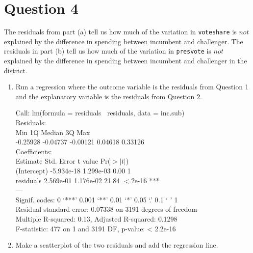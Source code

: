 \documentclass[12pt,letterpaper]{article}
\begin{document}
\section*{Question 4}
\noindent The residuals from part (a) tell us how much of the variation in \texttt{voteshare} is $not$ explained by the difference in spending between incumbent and challenger. The residuals in part (b) tell us how much of the variation in \texttt{presvote} is $not$ explained by the difference in spending between incumbent and challenger in the district.
	\begin{enumerate}
		\item Run a regression where the outcome variable is the residuals from Question 1 and the explanatory variable is the residuals from Question 2.	
		
		\vspace{.15cm}
		 
		\vspace{.15cm}
		\noindent
		Call:
		lm(formula = residuals $~$ residuals, data = inc.sub)\\
		
		Residuals:\\
		Min       1Q   Median       3Q      Max \\
		-0.25928 -0.04737 -0.00121  0.04618  0.33126\\ 
		
		Coefficients:\\
		Estimate Std. Error t value Pr($>|t|$)    \\
		(Intercept) -5.934e-18  1.299e-03    0.00        1 \\   
		residuals  2.569e-01  1.176e-02   21.84   $<$2e-16 ***\\
		---\\
		Signif. codes:  0 ‘***’ 0.001 ‘**’ 0.01 ‘*’ 0.05 ‘.’ 0.1 ‘ ’ 1\\
		
		Residual standard error: 0.07338 on 3191 degrees of freedom\\
		Multiple R-squared:   0.13,	Adjusted R-squared:  0.1298 \\
		F-statistic:   477 on 1 and 3191 DF,  p-value: < 2.2e-16\\
		
		\item Make a scatterplot of the two residuals and add the regression line. 	
		\vspace{.15cm}
		 
		\vspace{.15cm}
		\begin{figure}[h!]\centering
			

\end{figure}
\end{enumerate}
\end{document}
